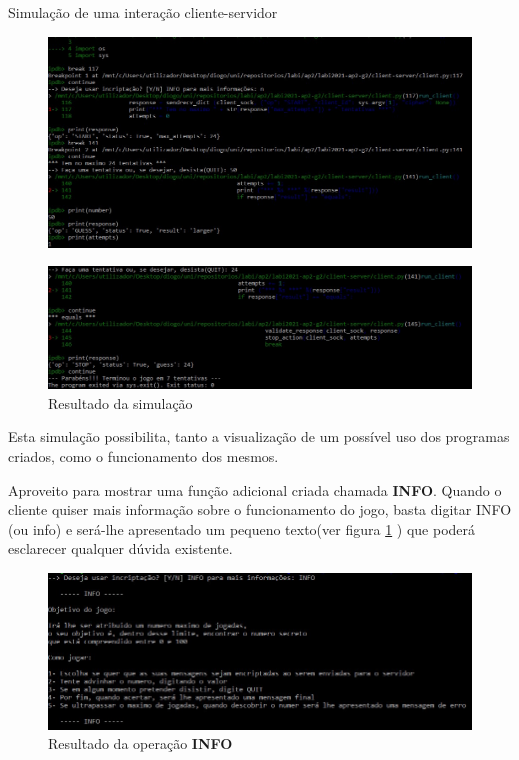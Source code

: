 \documentclass{report}
\newenvironment{changemargin}[2]{%
\begin{list}{}{%
\setlength{\topsep}{0pt}%
\setlength{\leftmargin}{#1}%
\setlength{\rightmargin}{#2}%
\setlength{\listparindent}{\parindent}%
\setlength{\itemindent}{\parindent}%
\setlength{\parsep}{\parskip}%
}%
\item[]}{\end{list}}
\theoremstyle{remark}
\begin{document}
{\begin{section}{Simulação de uma interação cliente-servidor}
\begin{enumerate}
\end{enumerate}

\begin{figure}[H]
\begin{changemargin}{-3.5cm}{-3.5cm}
\center
\includegraphics[width = 15 cm ]{p1sim.jpg}
\end{changemargin}
\end{figure}

\begin{figure}[H]
\begin{changemargin}{-3.5cm}{-3.5cm}
\center
\includegraphics[width = 15 cm ]{p2sim.jpg}
\caption{Resultado da simulação}
\end{changemargin}
\end{figure}

Esta simulação possibilita, tanto a visualização de um possível uso dos programas criados, como o funcionamento dos mesmos.

Aproveito para mostrar uma função adicional criada chamada \textbf{INFO}. Quando o cliente quiser mais informação sobre o funcionamento do jogo, basta digitar INFO (ou info) e será-lhe apresentado um pequeno texto(ver figura \ref{fig:info} ) que poderá esclarecer qualquer dúvida existente.

\begin{figure}[H]
\begin{changemargin}{-3.5cm}{-3.5cm}
\center
\includegraphics[width = 15 cm ]{info.jpg}
\caption{Resultado da operação \textbf{INFO}}
\label{fig:info}
\end{changemargin}
\end{figure}



\end{section}}
\end{document}
